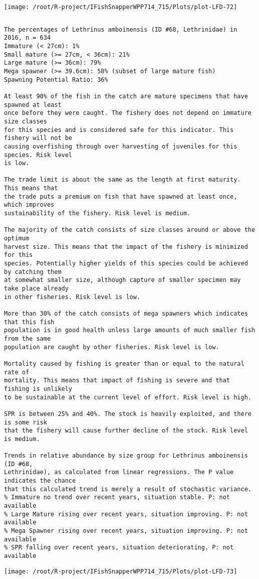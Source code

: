\documentclass{report}\usepackage[]{graphicx}\usepackage[]{color}
\makeatletter
\def\maxwidth{ %
  \ifdim\Gin@nat@width>\linewidth
    \linewidth
  \else
    \Gin@nat@width
  \fi
}
\newenvironment{kframe}{%
 \def\at@end@of@kframe{}%
 \ifinner\ifhmode%
  \def\at@end@of@kframe{\end{minipage}}%
  \begin{minipage}{\columnwidth}%
 \fi\fi%
 \def\FrameCommand##1{\hskip\@totalleftmargin \hskip-\fboxsep
 \colorbox{shadecolor}{##1}\hskip-\fboxsep
     \hskip-\linewidth \hskip-\@totalleftmargin \hskip\columnwidth}%
 \MakeFramed {\advance\hsize-\width
   \@totalleftmargin\z@ \linewidth\hsize
   \@setminipage}}%
 {\par\unskip\endMakeFramed%
 \at@end@of@kframe}
\newenvironment{knitrout}{}{} %
\makeatother
\begin{document}
\begin{knitrout}
\texttt{[image: /root/R-project/IFishSnapperWPP714\_715/Plots/plot-LFD-72]} 
\begin{kframe}\begin{verbatim}
\end{verbatim}
\end{kframe}
\clearpage
\newpage
\begin{kframe}\begin{verbatim}The percentages of Lethrinus amboinensis (ID #68, Lethrinidae) in 2016, n = 634
Immature (< 27cm): 1%
Small mature (>= 27cm, < 36cm): 21%
Large mature (>= 36cm): 79%
Mega spawner (>= 39.6cm): 58% (subset of large mature fish)
Spawning Potential Ratio: 36%
 
At least 90% of the fish in the catch are mature specimens that have spawned at least
once before they were caught. The fishery does not depend on immature size classes
for this species and is considered safe for this indicator. This fishery will not be
causing overfishing through over harvesting of juveniles for this species. Risk level
is low.

The trade limit is about the same as the length at first maturity.  This means that
the trade puts a premium on fish that have spawned at least once, which improves
sustainability of the fishery. Risk level is medium.

The majority of the catch consists of size classes around or above the optimum
harvest size. This means that the impact of the fishery is minimized for this
species. Potentially higher yields of this species could be achieved by catching them
at somewhat smaller size, although capture of smaller specimen may take place already
in other fisheries. Risk level is low.

More than 30% of the catch consists of mega spawners which indicates that this fish
population is in good health unless large amounts of much smaller fish from the same
population are caught by other fisheries. Risk level is low.
 
Mortality caused by fishing is greater than or equal to the natural rate of
mortality. This means that impact of fishing is severe and that fishing is unlikely
to be sustainable at the current level of effort. Risk level is high.
 
SPR is between 25% and 40%. The stock is heavily exploited, and there is some risk
that the fishery will cause further decline of the stock. Risk level is medium.
 
Trends in relative abundance by size group for Lethrinus amboinensis (ID #68,
Lethrinidae), as calculated from linear regressions. The P value indicates the chance
that this calculated trend is merely a result of stochastic variance.
% Immature no trend over recent years, situation stable. P: not available
% Large Mature rising over recent years, situation improving. P: not available
% Mega Spawner rising over recent years, situation improving. P: not available
% SPR falling over recent years, situation deteriorating. P: not available
\end{verbatim}
\end{kframe}
\texttt{[image: /root/R-project/IFishSnapperWPP714\_715/Plots/plot-LFD-73]} 


\end{knitrout}
\end{document}
